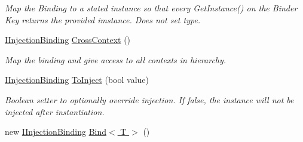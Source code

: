 \begin{DoxyCompactItemize}
\begin{DoxyCompactList}\small\item\em Map the Binding to a stated instance so that every {\ttfamily Get\-Instance()} on the Binder Key returns the provided imstance. Does not set type. \end{DoxyCompactList}\item 
\hypertarget{interfacestrange_1_1extensions_1_1injector_1_1api_1_1_i_injection_binding_a9ef8ddab4816a595f4e6db7e66be7d03}{\hyperlink{interfacestrange_1_1extensions_1_1injector_1_1api_1_1_i_injection_binding}{I\-Injection\-Binding} \hyperlink{interfacestrange_1_1extensions_1_1injector_1_1api_1_1_i_injection_binding_a9ef8ddab4816a595f4e6db7e66be7d03}{Cross\-Context} ()}\label{interfacestrange_1_1extensions_1_1injector_1_1api_1_1_i_injection_binding_a9ef8ddab4816a595f4e6db7e66be7d03}

\begin{DoxyCompactList}\small\item\em Map the binding and give access to all contexts in hierarchy. \end{DoxyCompactList}\item 
\hypertarget{interfacestrange_1_1extensions_1_1injector_1_1api_1_1_i_injection_binding_a372558a435574953af1cb6118306117d}{\hyperlink{interfacestrange_1_1extensions_1_1injector_1_1api_1_1_i_injection_binding}{I\-Injection\-Binding} \hyperlink{interfacestrange_1_1extensions_1_1injector_1_1api_1_1_i_injection_binding_a372558a435574953af1cb6118306117d}{To\-Inject} (bool value)}\label{interfacestrange_1_1extensions_1_1injector_1_1api_1_1_i_injection_binding_a372558a435574953af1cb6118306117d}

\begin{DoxyCompactList}\small\item\em Boolean setter to optionally override injection. If false, the instance will not be injected after instantiation. \end{DoxyCompactList}\item 
\hypertarget{interfacestrange_1_1extensions_1_1injector_1_1api_1_1_i_injection_binding_acc3be9225936c2385ae3dccdcd4847df}{new \hyperlink{interfacestrange_1_1extensions_1_1injector_1_1api_1_1_i_injection_binding}{I\-Injection\-Binding} \hyperlink{interfacestrange_1_1extensions_1_1injector_1_1api_1_1_i_injection_binding_acc3be9225936c2385ae3dccdcd4847df}{Bind$<$ T $>$} ()}\label{interfacestrange_1_1extensions_1_1injector_1_1api_1_1_i_injection_binding_acc3be9225936c2385ae3dccdcd4847df}


\end{DoxyCompactItemize}
